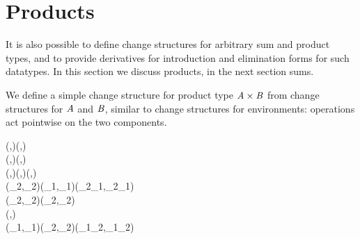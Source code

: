 \section{Products}
\label{sec:chs-products-intro}
It is also possible to define change structures for arbitrary sum and product
types, and to provide derivatives for introduction and elimination forms for
such datatypes. In this section we discuss products, in the next section sums.

We define a simple change structure for product type \ensuremath{\Conid{A}\times\Conid{B}} from change
structures for \ensuremath{\Conid{A}} and \ensuremath{\Conid{B}}, similar to change structures for environments:
operations act pointwise on the two components.
\begin{hscode}\SaveRestoreHook
{}%
%
%
\>[B]{}\;(\;,\;)\Rightarrow{}\;(,)\;\<[E]%
\\
\>[B]{}\<[3]%
\>[3]{}\;\Delta (,)\mathrel{=}(\Delta {},\Delta {}){}\<[E]%
\\
\>[B]{}\<[3]%
\>[3]{}(,)\oplus (,)\mathrel{=}(\oplus {},\oplus {}){}\<[E]%
\\
\>[B]{}\<[3]%
\>[3]{}(_{2},_{2})\ominus (_{1},_{1})\mathrel{=}(_{2}\ominus {}_{1},_{2}\ominus {}_{1}){}\<[E]%
\\
\>[B]{}\<[3]%
\>[3]{}\;(_{2},_{2})\mathrel{=}(\;_{2},\;_{2}){}\<[E]%
\\
\>[B]{}\<[3]%
\>[3]{}\mathrel{=}(,){}\<[E]%
\\
\>[B]{}\<[3]%
\>[3]{}(_{1},_{1})\circledcirc (_{2},_{2})\mathrel{=}(_{1}\circledcirc {}_{2},_{1}\circledcirc {}_{2}){}\<[E]%
\ColumnHook
\end{hscode}\resethooks


